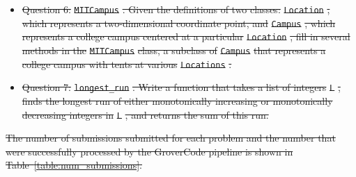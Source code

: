 \documentclass[12pt,twoside]{mitthesis}
\providecommand{\DIFdeltex}[1]{{\protect\color{red}\sout{#1}}}                      %
\providecommand{\DIFdel}[1]{\texorpdfstring{\DIFdeltex{#1}}{}} %
\begin{document}
{{{{{{{{{{\begin{itemize}

\item%
\DIFdel{Question 6: }\texttt{\DIFdel{MITCampus}}%
\DIFdel{. Given the definitions of two classes: }\texttt{\DIFdel{Location}}%
\DIFdel{, which represents a two-dimensional coordinate point, and }\texttt{\DIFdel{Campus}}%
\DIFdel{, which represents a college campus centered at a particular }\texttt{\DIFdel{Location}}%
\DIFdel{, fill in several methods in the }\texttt{\DIFdel{MITCampus}} %
\DIFdel{class, a subclass of }\texttt{\DIFdel{Campus}} %
\DIFdel{that represents a college campus with tents at various }\texttt{\DIFdel{Locations}}%
\DIFdel{.
}%


\item%
\DIFdel{Question 7: }\texttt{\DIFdel{longest\_run}}%
\DIFdel{. Write a function that takes a list of integers }\texttt{\DIFdel{L}}%
\DIFdel{, finds the longest run of either monotonically increasing or monotonically decreasing integers in }\texttt{\DIFdel{L}}%
\DIFdel{, and returns the sum of this run.
}%


 \end{itemize} %


\DIFdel{The number of submissions submitted for each problem and the number that were successfully processed by the GroverCode pipeline is shown in Table~\ref{table:num_submissions}.
}%

}}}}}}}}}}
\end{document}
